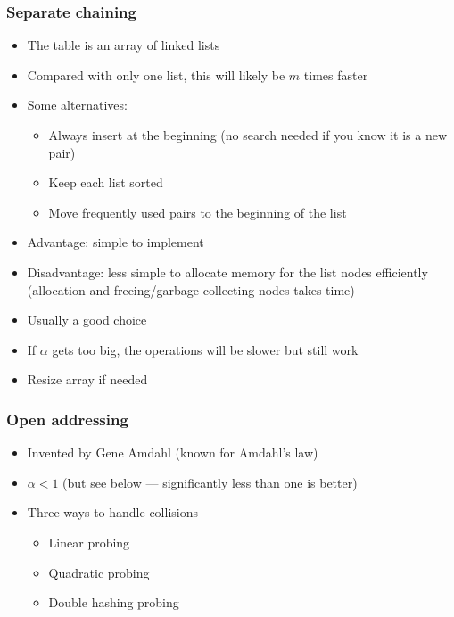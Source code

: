 \documentclass[trans]{beamer}
\begin{document}
\begin{frame}[fragile=singleslide]
\frametitle{Separate chaining}
\begin{itemize}
\item The table is an array of linked lists 
\item Compared with only one list, this will likely be $m$ times faster
\item Some alternatives:
\begin{itemize}
\item Always insert at the beginning (no search needed if you know it is a new pair)
\item Keep each list sorted 
\item Move frequently used pairs to the beginning of the list
\end{itemize}
\item Advantage: simple to implement
\item Disadvantage: less simple to allocate memory for the list nodes efficiently (allocation and freeing/garbage collecting nodes takes time)
\item Usually a good choice
\item If $\alpha$ gets too big, the operations will be slower but still work
\item Resize array if needed
\end{itemize}
\end{frame}

\begin{frame}[fragile=singleslide]
\frametitle{Open addressing}
\begin{itemize}
\item Invented by Gene Amdahl (known for Amdahl's law)
\item $\alpha < 1$ (but see below --- significantly less than one is better)
\item Three ways to handle collisions
\begin{itemize}
\item Linear probing
\item Quadratic probing
\item Double hashing probing
\end{itemize}
\end{itemize}
\end{frame}
\end{document}
